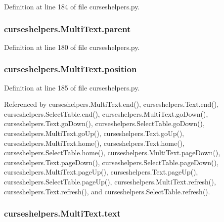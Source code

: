 Definition at line 184 of file curseshelpers.\-py.

\subsubsection[{parent}]{\setlength{\rightskip}{0pt plus 5cm}curseshelpers.\-Multi\-Text.\-parent}\label{classcurseshelpers_1_1MultiText_ad7d7583f199540d4f6b50bf4d1d37536}


Definition at line 180 of file curseshelpers.\-py.

\subsubsection[{position}]{\setlength{\rightskip}{0pt plus 5cm}curseshelpers.\-Multi\-Text.\-position}\label{classcurseshelpers_1_1MultiText_a7f620714a54a56fa9a6d355c38b0bfa9}


Definition at line 185 of file curseshelpers.\-py.



Referenced by curseshelpers.\-Multi\-Text.\-end(), curseshelpers.\-Text.\-end(), curseshelpers.\-Select\-Table.\-end(), curseshelpers.\-Multi\-Text.\-go\-Down(), curseshelpers.\-Text.\-go\-Down(), curseshelpers.\-Select\-Table.\-go\-Down(), curseshelpers.\-Multi\-Text.\-go\-Up(), curseshelpers.\-Text.\-go\-Up(), curseshelpers.\-Multi\-Text.\-home(), curseshelpers.\-Text.\-home(), curseshelpers.\-Select\-Table.\-home(), curseshelpers.\-Multi\-Text.\-page\-Down(), curseshelpers.\-Text.\-page\-Down(), curseshelpers.\-Select\-Table.\-page\-Down(), curseshelpers.\-Multi\-Text.\-page\-Up(), curseshelpers.\-Text.\-page\-Up(), curseshelpers.\-Select\-Table.\-page\-Up(), curseshelpers.\-Multi\-Text.\-refresh(), curseshelpers.\-Text.\-refresh(), and curseshelpers.\-Select\-Table.\-refresh().

\subsubsection[{text}]{\setlength{\rightskip}{0pt plus 5cm}curseshelpers.\-Multi\-Text.\-text}\label{classcurseshelpers_1_1MultiText_ac0ac8cc9a8a2418f330121f268122e1d}


